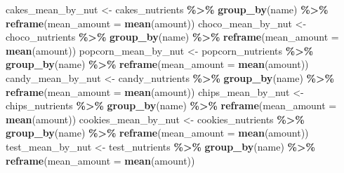 \documentclass[
]{article}
\newenvironment{Shaded}{\begin{snugshade}}{\end{snugshade}}
\newcommand{\AttributeTok}[1]{\textcolor[rgb]{0.13,0.29,0.53}{#1}}
\newcommand{\FunctionTok}[1]{\textcolor[rgb]{0.13,0.29,0.53}{\textbf{#1}}}
\newcommand{\NormalTok}[1]{#1}
\newcommand{\OtherTok}[1]{\textcolor[rgb]{0.56,0.35,0.01}{#1}}
\newcommand{\SpecialCharTok}[1]{\textcolor[rgb]{0.81,0.36,0.00}{\textbf{#1}}}
\begin{document}
\begin{Shaded}
\begin{Highlighting}[]
\NormalTok{cakes\_mean\_by\_nut }\OtherTok{\textless{}{-}}\NormalTok{ cakes\_nutrients }\SpecialCharTok{\%\textgreater{}\%} \FunctionTok{group\_by}\NormalTok{(name) }\SpecialCharTok{\%\textgreater{}\%} \FunctionTok{reframe}\NormalTok{(}\AttributeTok{mean\_amount =} \FunctionTok{mean}\NormalTok{(amount)) }
\NormalTok{choco\_mean\_by\_nut }\OtherTok{\textless{}{-}}\NormalTok{ choco\_nutrients }\SpecialCharTok{\%\textgreater{}\%} \FunctionTok{group\_by}\NormalTok{(name) }\SpecialCharTok{\%\textgreater{}\%} \FunctionTok{reframe}\NormalTok{(}\AttributeTok{mean\_amount =} \FunctionTok{mean}\NormalTok{(amount))}
\NormalTok{popcorn\_mean\_by\_nut }\OtherTok{\textless{}{-}}\NormalTok{ popcorn\_nutrients }\SpecialCharTok{\%\textgreater{}\%} \FunctionTok{group\_by}\NormalTok{(name) }\SpecialCharTok{\%\textgreater{}\%} \FunctionTok{reframe}\NormalTok{(}\AttributeTok{mean\_amount =} \FunctionTok{mean}\NormalTok{(amount))}
\NormalTok{candy\_mean\_by\_nut }\OtherTok{\textless{}{-}}\NormalTok{ candy\_nutrients }\SpecialCharTok{\%\textgreater{}\%} \FunctionTok{group\_by}\NormalTok{(name) }\SpecialCharTok{\%\textgreater{}\%} \FunctionTok{reframe}\NormalTok{(}\AttributeTok{mean\_amount =} \FunctionTok{mean}\NormalTok{(amount))}
\NormalTok{chips\_mean\_by\_nut }\OtherTok{\textless{}{-}}\NormalTok{ chips\_nutrients }\SpecialCharTok{\%\textgreater{}\%} \FunctionTok{group\_by}\NormalTok{(name) }\SpecialCharTok{\%\textgreater{}\%} \FunctionTok{reframe}\NormalTok{(}\AttributeTok{mean\_amount =} \FunctionTok{mean}\NormalTok{(amount))}
\NormalTok{cookies\_mean\_by\_nut }\OtherTok{\textless{}{-}}\NormalTok{ cookies\_nutrients }\SpecialCharTok{\%\textgreater{}\%} \FunctionTok{group\_by}\NormalTok{(name) }\SpecialCharTok{\%\textgreater{}\%} \FunctionTok{reframe}\NormalTok{(}\AttributeTok{mean\_amount =} \FunctionTok{mean}\NormalTok{(amount))}
\NormalTok{test\_mean\_by\_nut }\OtherTok{\textless{}{-}}\NormalTok{ test\_nutrients }\SpecialCharTok{\%\textgreater{}\%} \FunctionTok{group\_by}\NormalTok{(name) }\SpecialCharTok{\%\textgreater{}\%} \FunctionTok{reframe}\NormalTok{(}\AttributeTok{mean\_amount =} \FunctionTok{mean}\NormalTok{(amount))}
\end{Highlighting}
\end{Shaded}
\end{document}
